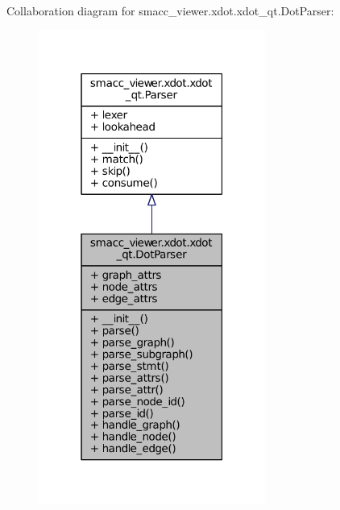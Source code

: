 Collaboration diagram for smacc\+\_\+viewer.\+xdot.\+xdot\+\_\+qt.\+Dot\+Parser\+:
\nopagebreak
\begin{figure}[H]
\begin{center}
\leavevmode
\includegraphics[width=211pt]{classsmacc__viewer_1_1xdot_1_1xdot__qt_1_1DotParser__coll__graph}
\end{center}
\end{figure}
